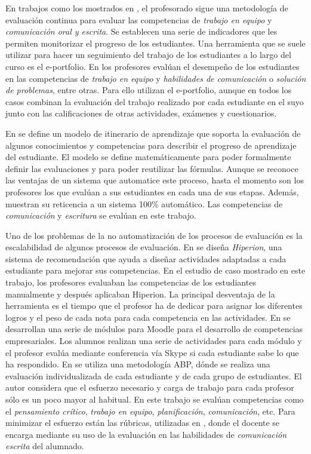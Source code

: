 En trabajos como los mostrados en \cite{martin2010new,prashar2010competence}, el profesorado sigue una metodología de evaluación continua para evaluar las competencias de \emph{trabajo en equipo} y \emph{comunicación oral y escrita}. Se establecen una serie de indicadores que les permiten monitorizar el progreso de los estudiantes. Una herramienta que se suele utilizar para hacer un seguimiento del trabajo de los estudiantes a lo largo del curso es el e-portfolio. En \cite{martin2013acquired,rodriguez2010portfolio,benlloch2007adapting} los profesores evalúan el desempeño de los estudiantes en las competencias de \emph{trabajo en equipo} y \emph{habilidades de comunicación} o \emph{solución de problemas}, entre otras. Para ello utilizan el e-portfolio, aunque en todos los casos combinan la evaluación del trabajo realizado por cada estudiante en el suyo junto con las calificaciones de otras actividades, exámenes y cuestionarios.

En \cite{yang2014fine} se define un modelo de itinerario de aprendizaje que soporta la evaluación de algunos conocimientos y competencias para describir el progreso de aprendizaje del estudiante. El modelo se define matemáticamente para poder formalmente definir las evaluaciones y para poder reutilizar las fórmulas. Aunque se reconoce las ventajas de un sistema que automatice este proceso, hasta el momento son los profesores los que evalúan a sus estudiantes en cada una de sus etapas. Además, muestran su reticencia a un sistema 100\% automático. Las competencias de \emph{comunicación} y \emph{escritura} se evalúan en este trabajo.

Uno de los problemas de la no automatización de los procesos de evaluación es la escalabilidad de algunos procesos de evaluación. En \cite{serrano2013hiperion} se diseña \emph{Hiperion}, una sistema de recomendación que ayuda a diseñar actividades adaptadas a cada estudiante para mejorar sus competencias. En el estudio de caso mostrado en este trabajo, los profesores evaluaban las competencias de los estudiantes manualmente y después aplicaban Hiperion. La principal desventaja de la herramienta es el tiempo que el profesor ha de dedicar para asignar los diferentes logros y el peso de cada nota para cada competencia en las actividades. En \cite{ward2011developing} se desarrollan una serie de módulos para Moodle para el desarrollo de competencias empresariales. Los alumnos realizan una serie de actividades para cada módulo y el profesor evalúa mediante conferencia vía Skype si cada estudiante sabe lo que ha respondido. En \cite{lacuesta2009active} se utiliza una metodología ABP, dónde se realiza una evaluación individualizada de cada estudiante y de cada grupo de estudiantes. El autor considera que el esfuerzo necesario y carga de trabajo para cada profesor sólo es un poco mayor al habitual. En este trabajo se evalúan competencias como el \emph{pensamiento crítico}, \emph{trabajo en equipo}, \emph{planificación}, \emph{comunicación}, etc. Para minimizar el esfuerzo están las rúbricas, utilizadas en \cite{casan2015developing}, donde el docente se encarga mediante su uso de la evaluación en las habilidades de \emph{comunicación escrita} del alumnado.

